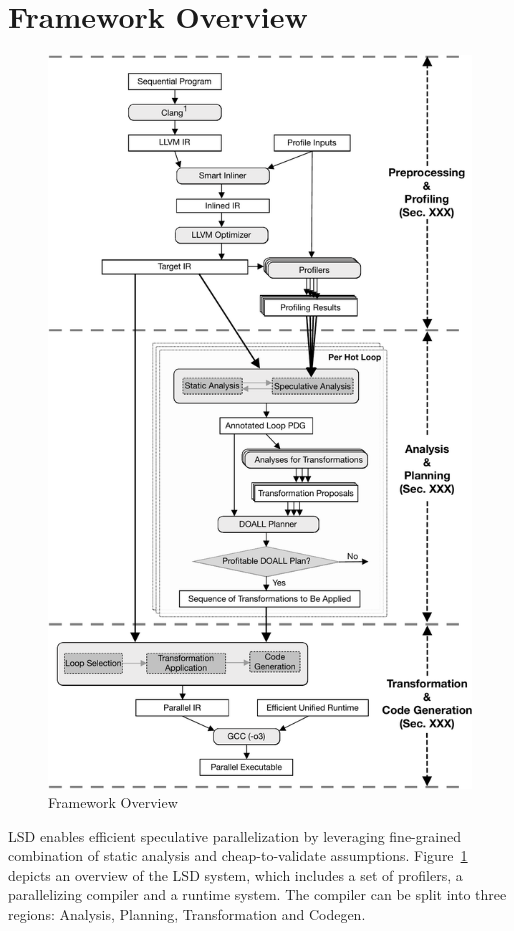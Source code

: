 \section{Framework Overview}

\begin{figure}[htp]
  \includegraphics[width=\columnwidth]{figures/compiler-pipeline-crop}
  \caption{Framework Overview}
  \label{fig:compiler-pipeline}
\end{figure}

LSD enables efficient speculative parallelization by leveraging
fine-grained combination of static analysis and cheap-to-validate
assumptions.
%
Figure~\ref{fig:compiler-pipeline} depicts an overview of the LSD system,
which includes a set of profilers, a parallelizing compiler and a runtime
system.
%
The compiler can be split into three regions: Analysis, Planning,
Transformation and Codegen.

